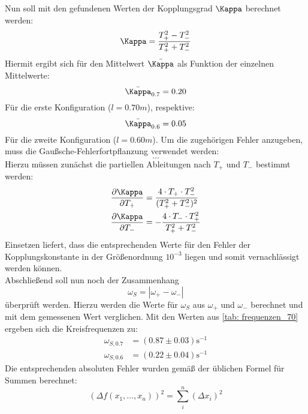 Nun soll mit den gefundenen Werten der Kopplungsgrad $\Kappa$ berechnet werden:
\begin{equation}
  \Kappa = \frac{T_{+}^2 - T_{-}^2}{T_{+}^2 + T_{-}^2}
\end{equation}
Hiermit ergibt sich für den Mittelwert $\bar{\Kappa}$ als Funktion der einzelnen Mittelwerte:
\begin{equation}
\bar{\Kappa}_{0.7} = 0.20
\end{equation}
Für die erste Konfiguration ($l = 0.70m$), respektive:
\begin{equation}
\bar{\Kappa}_{0.6} = 0.05
\end{equation}
Für die zweite Konfiguration ($l = 0.60m$). Um die zugehörigen Fehler anzugeben, muss die Gaußsche-Fehlerfortpflanzung verwendet werden:
\begin{equation}
  \dots
\end{equation}
Hierzu müssen zunächst die partiellen Ableitungen nach $T_{+}$ und $T_{-}$ bestimmt werden:
\begin{align}
  \frac{\partial \Kappa}{\partial T_{+}} &= \frac{4 \cdot T_{+} \cdot T_{-}^2}{(T_{+}^2 + T_{-}^2)^2} \\
  \frac{\partial \Kappa}{\partial T_{-}} &= - \frac{4 \cdot T_{-} \cdot T_{+}^2 }{T_{+}^2 + T_{-}^2}
\end{align}
Einsetzen liefert, dass die entsprechenden Werte für den Fehler der Kopplungskonstante in der Größenordnung $10^{-3}$ liegen und somit
vernachlässigt werden können. \\
Abschließend soll nun noch der Zusammenhang
\begin{equation}
 \omega_{S} = |\omega_{+} - \omega_{-}|
 \label{eq: bla}
\end{equation}
überprüft werden. Hierzu werden die Werte für $\omega_{S}$ aus $\omega_{+}$ und $\omega_{-}$ berechnet und mit dem gemessenen Wert verglichen.
Mit den Werten aus \ref{tab: frequenzen_70} ergeben sich die Kreisfrequenzen zu:
\begin{align}
  \omega_{S, 0.7} &= (0.87 \pm 0.03) \si{\second ^{-1}} \\
  \omega_{S, 0.6} &= (0.22 \pm 0.04) \si{\second^{-1}}
\end{align}
Die entsprechenden absoluten Fehler wurden gemäß der üblichen Formel für Summen berechnet:
\begin{equation}
(\Delta f(x_1, \dots ,x_n))^2 = \sum _i^n (\Delta x_i) ^2
\end{equation}



